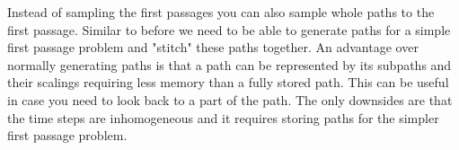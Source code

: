 \documentclass[a4paper,12pt]{article}
\begin{document}





\begin{technique}
    Instead of sampling the first passages you can also sample
    whole paths to the first passage. Similar to before we need to be
    able to generate paths for a simple first passage problem and "stitch"
    these paths together. An advantage over normally generating paths
    is that a path can be represented by its subpaths and their scalings
    requiring less memory than a fully stored path. This can be useful
    in case you need to look back to a part of the path.
    The only downsides are that the time steps are inhomogeneous
    and it requires storing paths for the simpler first passage problem.
\end{technique}
\end{document}
